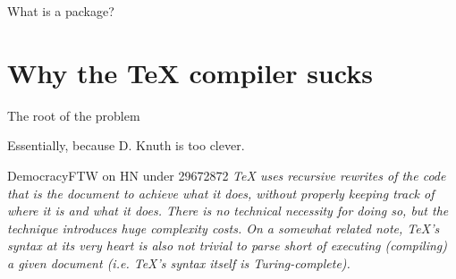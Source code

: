 \documentclass[aspectratio=169]{beamer}
\begin{document}
\begin{frame}[fragile]{What is a package?}
\begin{figure}[H]
  \end{figure}
\end{frame}

\section{Why the \TeX{} compiler sucks}

\begin{frame}{The root of the problem}
  
  {\Large 
    Essentially, because D. Knuth is too clever.
  }
  
  \begin{block}{DemocracyFTW on HN under 29672872}
    \itshape
    TeX uses recursive rewrites of the code that is the document to achieve
    what it does, without properly keeping track of where it is and what it
    does. There is no technical necessity for doing so, but the technique
    introduces huge complexity costs. On a somewhat related note, TeX's syntax
    at its very heart is also not trivial to parse short of executing
    (compiling) a given document (i.e. TeX's syntax itself is Turing-complete).
  \end{block}
\end{frame}
\end{document}
